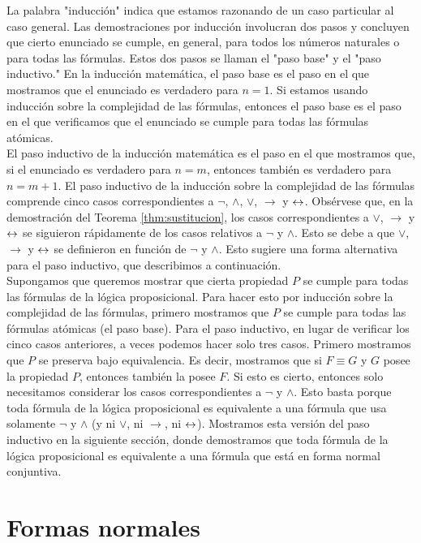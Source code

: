 \message{ !name(main.tex)}\documentclass[12pt,a4paper]{book}
\newcommand{\comillas}[1]{"#1"}
\begin{document}
    La palabra \comillas{inducción} indica que estamos razonando de un caso particular al caso general. Las demostraciones por
    inducción involucran dos pasos y concluyen que cierto enunciado se cumple, en general, para todos los números naturales o
    para todas las fórmulas. Estos dos pasos se llaman el \comillas{paso base} y el \comillas{paso inductivo.} En la inducción
    matemática, el paso base es el paso en el que mostramos que el enunciado es verdadero para $n=1$. Si estamos usando
    inducción sobre la complejidad de las fórmulas, entonces el paso base es el paso en el que verificamos que el enunciado se
    cumple para todas las fórmulas atómicas.\\
    El paso inductivo de la inducción matemática es el paso en el que mostramos que, si el enunciado es verdadero para
    $n=m$, entonces también es verdadero para $n=m+1$. El paso inductivo de la inducción sobre la complejidad de las fórmulas
    comprende cinco casos correspondientes a $\neg$, $\wedge$, $\vee$, $\rightarrow$ y $\leftrightarrow$. Obsérvese que, en la
    demostración del Teorema \ref{thm:sustitucion}, los casos correspondientes a $\vee$, $\rightarrow$ y $\leftrightarrow$ se siguieron
    rápidamente de los casos relativos a $\neg$ y $\wedge$. Esto se debe a que $\vee$, $\rightarrow$ y $\leftrightarrow$ se definieron en
    función de $\neg$ y $\wedge$. Esto sugiere una forma alternativa para el paso inductivo, que describimos a continuación.\\
    Supongamos que queremos mostrar que cierta propiedad $P$ se cumple para todas las fórmulas de la lógica proposicional.
    Para hacer esto por inducción sobre la complejidad de las fórmulas, primero mostramos que $P$ se cumple para todas las
    fórmulas atómicas (el paso base). Para el paso inductivo, en lugar de verificar los cinco casos anteriores, a veces
    podemos hacer solo tres casos. Primero mostramos que $P$ se preserva bajo equivalencia. Es decir, mostramos que si
    $F\equiv G$ y $G$ posee la propiedad $P$, entonces también la posee $F$. Si esto es cierto, entonces solo necesitamos
    considerar los casos correspondientes a $\neg$ y $\wedge$. Esto basta porque toda fórmula de la lógica proposicional es
    equivalente a una fórmula que usa solamente $\neg$ y $\wedge$ (y ni $\vee$, ni $\rightarrow$, ni $\leftrightarrow$). Mostramos esta
    versión del paso inductivo en la siguiente sección, donde demostramos que toda fórmula de la lógica proposicional es
    equivalente a una fórmula que está en forma normal conjuntiva.

    \section{Formas normales}
\end{document}
